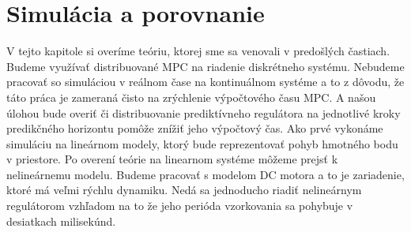 \chapter{Simulácia a porovnanie}
\label{part:Simulacie}
V tejto kapitole si overíme teóriu, ktorej sme sa venovali v predošlých častiach. Budeme využívať distribuované MPC na riadenie diskrétneho systému. Nebudeme pracovať so simuláciou v reálnom čase na kontinuálnom systéme a to z dôvodu, že táto práca je zameraná čisto na zrýchlenie výpočtového času MPC. A našou úlohou bude overiť či distribuovanie prediktívneho regulátora na jednotlivé kroky predikčného horizontu pomôže znížiť jeho výpočtový čas. Ako prvé vykonáme simuláciu na lineárnom modely, ktorý bude reprezentovať pohyb hmotného bodu v priestore. Po overení teórie na linearnom systéme môžeme prejsť k nelineárnemu modelu. Budeme pracovať s modelom DC motora a to je zariadenie, ktoré má veľmi rýchlu dynamiku. Nedá sa jednoducho riadiť nelineárnym regulátorom vzhľadom na to že jeho perióda vzorkovania sa pohybuje v desiatkach milisekúnd.




